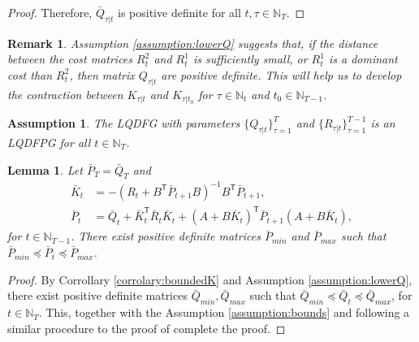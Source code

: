 \documentclass[letterpaper, 10 pt, conference]{ieeeconf}  %
\newcommand{\transpose}{\mathsf{T}}
\newtheorem{lemma}{Lemma}
\newtheorem{assumption}{Assumption}
\newtheorem{remark}{Remark}
\begin{document}
\begin{proof}
    Therefore, $\bar{Q}_{\tau|t}$ is positive definite for all $t,\tau \in \mathbb{N}_{T}$.
\end{proof}

\begin{remark}
    Assumption \ref{assumption:lowerQ} suggests that, if the distance between the cost matrices $R_{t}^{2}$ and $R_{t}^{1}$ is sufficiently small, or $R_{t}^{1}$ is a dominant cost than $R_{t}^{2}$, then matrix $Q_{\tau|t}$ are positive definite. This will help us to develop the contraction between $K_{\tau|t}$ and $K_{\tau|t_{0}}$ for $\tau \in \mathbb{N}_t$ and $t_{0} \in \mathbb{N}_{T-1}$.
\end{remark}
\begin{assumption}
    The LQDFG with parameters $\{Q_{\tau|t}\}_{\tau=1}^{T}$ and $\{R_{\tau|t}\}_{\tau=1}^{T-1}$ is an LQDFPG for all $t\in \mathbb{N}_{T}$.
\end{assumption}
\begin{lemma}\label{lemma:boundedP}
Let $\bar{P}_{T} = \bar{Q}_{T}$ and 
    \begin{align*}
        \bar{K}_{t}& = -(R_{t}+ B^{\transpose}\bar{P}_{t+1}B)^{-1}B^{\transpose}\bar{P}_{t+1},\\
        \bar{P}_{t}& = \bar{Q}_{t} + \bar{K}_{t}^{\transpose}\bar{R}_{t}\bar{K}_{t} + (A+B\bar{K}_{t})^{\transpose}\bar{P}_{t+1}(A+B\bar{K}_{t}),
    \end{align*}
    for $t \in \mathbb{N}_{T-1}$. There exist positive definite matrices $\bar{P}_{min}$ and $\bar{P}_{max}$ such that $
        \bar{P}_{min} \preceq \bar{P}_{t} \preceq \bar{P}_{max}$.
\end{lemma}
\begin{proof}
    By Corrollary \ref{corrolary:boundedK} and Assumption \ref{assumption:lowerQ}, there exist positive definite matrices $\bar{Q}_{min},\bar{Q}_{max}$ such that $
        \bar{Q}_{min} \preceq \bar{Q}_{t} \preceq \bar{Q}_{max}$,
    for $t\in\mathbb{N}_{T}$.
    This, together with the Assumption \ref{assumption:bounds} and following a similar procedure to the proof of \cite[Proposition 11]{zhang_regret_2021} complete the proof.
\end{proof}
\end{document}
